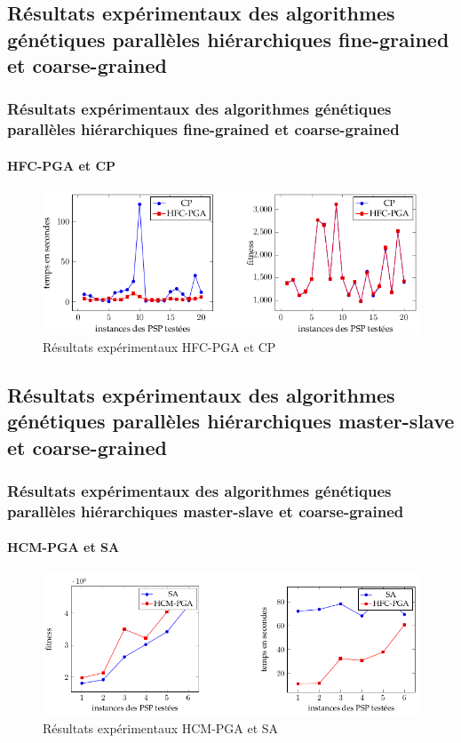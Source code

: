 \documentclass[11pt]{beamer}
\begin{document}
 \subsection{Résultats expérimentaux des algorithmes génétiques parallèles hiérarchiques fine-grained et coarse-grained}
 
 \begin{frame}
 \frametitle{Résultats expérimentaux des algorithmes génétiques parallèles hiérarchiques fine-grained et coarse-grained}
 \framesubtitle{HFC-PGA et CP}
 \begin{figure}[!h]
		\begin{center}
			\includegraphics[scale=.4
			]{img/cp_hfc.png}
			\caption{Résultats expérimentaux HFC-PGA et CP}
		\end{center}
 \end{figure}
 \end{frame}
 
 \subsection{Résultats expérimentaux des algorithmes génétiques parallèles hiérarchiques master-slave et coarse-grained}
 
 \begin{frame}
 \frametitle{Résultats expérimentaux des algorithmes génétiques parallèles hiérarchiques master-slave et coarse-grained}
 \framesubtitle{HCM-PGA et SA}
 \begin{figure}[!h]
		\begin{center}
			\includegraphics[scale=.4
			]{img/sa_hcm.png}
			\caption{Résultats expérimentaux HCM-PGA et SA}
		\end{center}
 \end{figure}
 \end{frame}
 
\end{document}
